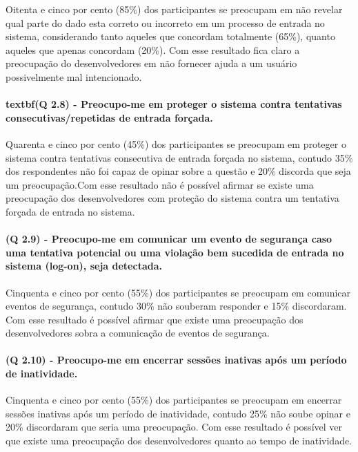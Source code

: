 Oitenta e cinco por cento (85{\%}) dos participantes se preocupam em não revelar qual parte do dado esta correto ou incorreto em um processo de entrada no sistema, considerando tanto aqueles que concordam totalmente (65{\%}), quanto aqueles que apenas concordam (20{\%}). Com esse resultado fica claro a preocupação do desenvolvedores em não fornecer ajuda a um usuário possivelmente mal intencionado.

\paragraph{textbf{(Q 2.8)} - Preocupo-me em proteger o sistema contra tentativas consecutivas/repetidas de entrada forçada.}

Quarenta e cinco por cento (45{\%}) dos participantes se preocupam em proteger o sistema contra tentativas consecutiva de entrada forçada no sistema, contudo 35{\%} dos respondentes não foi capaz de opinar sobre a questão e 20{\%} discorda que seja um preocupação.Com esse resultado não é possível afirmar se existe uma preocupação dos desenvolvedores com proteção do sistema contra um tentativa forçada de entrada no sistema.

\paragraph{\textbf{(Q 2.9)} - Preocupo-me em comunicar um evento de segurança caso uma tentativa potencial ou uma violação bem sucedida de entrada no sistema (log-on), seja detectada.}

Cinquenta e cinco por cento (55{\%}) dos participantes se preocupam em comunicar eventos de segurança, contudo 30{\%} não souberam responder e 15{\%} discordaram. Com esse resultado é possível afirmar que existe uma preocupação dos desenvolvedores sobra a comunicação de eventos de segurança.

\paragraph{\textbf{(Q 2.10)} - Preocupo-me em encerrar sessões inativas após um período de inatividade.}

Cinquenta e cinco por cento (55{\%}) dos participantes se preocupam em encerrar sessões inativas após um período de inatividade, contudo 25{\%} não soube opinar e 20{\%} discordaram que seria uma preocupação. Com esse resultado é possível  ver que existe uma preocupação dos desenvolvedores quanto ao tempo de inatividade.

